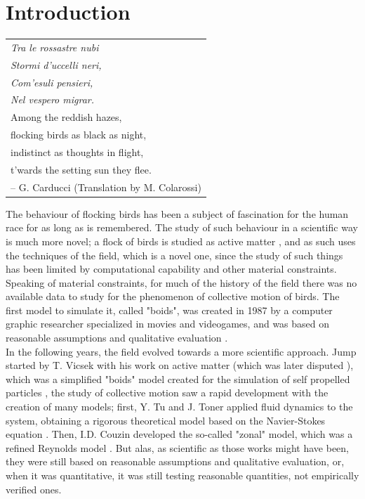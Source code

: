 \section{Introduction}
\begin{table}[h]
    \centering
    \begin{tabular}{l}
        \textit{Tra le rossastre nubi}                 \\
        \textit{Stormi d’uccelli neri,}                \\
        \textit{Com’esuli pensieri,}                   \\
        \textit{Nel vespero migrar.}                   \\
        \noalign{\smallskip}
        \scriptsize Among the reddish hazes,           \\
        \scriptsize flocking birds as black as night,  \\
        \scriptsize indistinct as thoughts in flight,  \\
        \scriptsize t’wards the setting sun they flee. \\
        \noalign{\smallskip}
        \scriptsize -- G. Carducci (Translation by M. Colarossi)
    \end{tabular}
\end{table}
The behaviour of flocking birds has been a subject of fascination for the human race for as long as is remembered. The study of such behaviour in a scientific way is much more novel; a flock of birds is studied as active matter \cite{vicsek_review}, and as such uses the techniques of the field, which is a novel one, since the study of such things has been limited by computational capability and other material constraints. Speaking of material constraints, for much of the history of the field there was no available data to study for the phenomenon of collective motion of birds. The first model to simulate it, called "boids", was created in 1987 by a computer graphic researcher specialized in movies and videogames, and was based on reasonable assumptions and qualitative evaluation \cite{reynolds} \cite{boids}.  \\
In the following years, the field evolved towards a more scientific approach. Jump started by T. Vicsek with his work on active matter (which was later disputed \cite{chate}), which was a simplified "boids" model created for the simulation of self propelled particles \cite{vicsek} \cite{vicsek_manual} \cite{vicsek_review}, the study of collective motion saw a rapid development with the creation of many models; first, Y. Tu and J. Toner applied fluid dynamics to the system, obtaining a rigorous theoretical model based on the Navier-Stokes equation \cite{toner_tu}. Then, I.D. Couzin developed the so-called "zonal" model, which was a refined Reynolds model \cite{couzin}. But alas, as scientific as those works might have been, they were still based on reasonable assumptions and qualitative evaluation, or, when it was quantitative, it was still testing reasonable quantities, not empirically verified ones. \\
